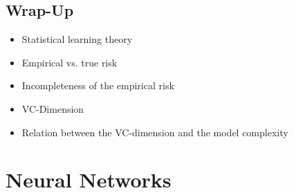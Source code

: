 \documentclass[a4paper, 11pt, accentcolor = tud3b]{tudreport}
\begin{document}
		\section{Wrap-Up}
			\begin{itemize}
				\item Statistical learning theory
				\item Empirical vs. true risk
				\item Incompleteness of the empirical risk
				\item VC-Dimension
				\item Relation between the VC-dimension and the model complexity
			\end{itemize}

	\chapter{Neural Networks}
\end{document}
